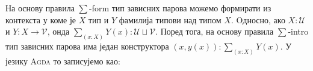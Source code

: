 На основу правила $\sum$-form тип зависних парова можемо формирати из контекста у коме је $X$ тип и $Y$ фамилија типови над типом $X$. Oдносно, ако $X : \mathcal{U}$ и $Y : X \to \mathcal{V}$, онда $\sum_{(x : X)} Y (x) : \mathcal{U} \sqcup \mathcal{V}$. Поред тога, на основу правила $\sum$-intro тип зависних парова има један конструктора $(x , y(x)) : \sum_{(x : X)} Y (x)$. У језику \textsc{Agda} то записујемо као:
\begin{code}%
\>[0]\AgdaSpace{}%
\AgdaSpace{}%
\AgdaSymbol{\{}\AgdaSpace{}%
\AgdaSymbol{\}}\AgdaSpace{}%
\AgdaSymbol{\{}\AgdaSpace{}%
\AgdaSymbol{:}\AgdaSpace{}%
\AgdaSpace{}%
\AgdaSpace{}%
\AgdaSymbol{\}}\AgdaSpace{}%
\AgdaSymbol{(}\AgdaSpace{}%
\AgdaSymbol{:}\AgdaSpace{}%
\AgdaSpace{}%
\AgdaSpace{}%
\AgdaSpace{}%
\AgdaSpace{}%
\AgdaSymbol{)}\AgdaSpace{}%
\AgdaSymbol{:}\AgdaSpace{}%
\AgdaSpace{}%
\AgdaSpace{}%
\AgdaSpace{}%
%
\>[52]\<%
\\
\>[0][@{}l@{\AgdaIndent{0}}]%
\>[4]\<%
\\
\>[4][@{}l@{\AgdaIndent{0}}]%
\>[8]\AgdaOperator{\AgdaInductiveConstructor{\AgdaUnderscore{},\AgdaUnderscore{}}}\<%
\\
%
\>[4]\<%
\\
\>[4][@{}l@{\AgdaIndent{0}}]%
\>[8]\AgdaSpace{}%
\AgdaSymbol{:}\AgdaSpace{}%
\<%
\\
%
\>[8]\AgdaSpace{}%
\AgdaSymbol{:}\AgdaSpace{}%
\AgdaSpace{}%
\<%
\end{code}

